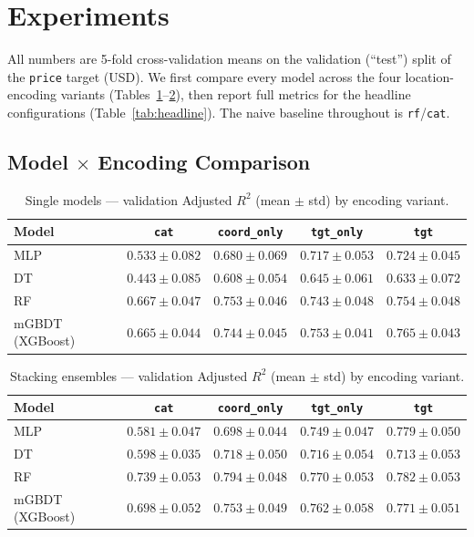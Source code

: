\section{Experiments}
\label{sec:result}

All numbers are 5-fold cross-validation means on the validation (``test'') split of
the \texttt{price} target (USD). We first compare every model across the four
location-encoding variants (Tables~\ref{tab:single}--\ref{tab:ensemble}), then
report full metrics for the headline configurations (Table~\ref{tab:headline}).
The naive baseline throughout is \texttt{rf}/\texttt{cat}.

\subsection{Model $\times$ Encoding Comparison}

\begin{table}[h]
\centering
\caption{Single models --- validation Adjusted $R^2$ (mean $\pm$ std) by encoding variant.}
\label{tab:single}
\begin{tabular}{lcccc}
\toprule
\textbf{Model} & \texttt{cat} & \texttt{coord\_only} & \texttt{tgt\_only} & \texttt{tgt} \\
\midrule
MLP             & $0.533 \pm 0.082$ & $0.680 \pm 0.069$ & $0.717 \pm 0.053$ & $0.724 \pm 0.045$ \\
DT              & $0.443 \pm 0.085$ & $0.608 \pm 0.054$ & $0.645 \pm 0.061$ & $0.633 \pm 0.072$ \\
RF              & $0.667 \pm 0.047$ & $0.753 \pm 0.046$ & $0.743 \pm 0.048$ & $0.754 \pm 0.048$ \\
mGBDT (XGBoost) & $0.665 \pm 0.044$ & $0.744 \pm 0.045$ & $0.753 \pm 0.041$ & $\mathbf{0.765 \pm 0.043}$ \\
\bottomrule
\end{tabular}
\end{table}

\begin{table}[h]
\centering
\caption{Stacking ensembles --- validation Adjusted $R^2$ (mean $\pm$ std) by encoding variant.}
\label{tab:ensemble}
\begin{tabular}{lcccc}
\toprule
\textbf{Model} & \texttt{cat} & \texttt{coord\_only} & \texttt{tgt\_only} & \texttt{tgt} \\
\midrule
MLP             & $0.581 \pm 0.047$ & $0.698 \pm 0.044$ & $0.749 \pm 0.047$ & $0.779 \pm 0.050$ \\
DT              & $0.598 \pm 0.035$ & $0.718 \pm 0.050$ & $0.716 \pm 0.054$ & $0.713 \pm 0.053$ \\
RF              & $0.739 \pm 0.053$ & $\mathbf{0.794 \pm 0.048}$ & $0.770 \pm 0.053$ & $0.782 \pm 0.053$ \\
mGBDT (XGBoost) & $0.698 \pm 0.052$ & $0.753 \pm 0.049$ & $0.762 \pm 0.058$ & $0.771 \pm 0.051$ \\
\bottomrule
\end{tabular}
\end{table}

